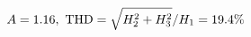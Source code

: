 \documentclass[preview]{standalone}
\begin{document}
\begin{align*}
\special{dvisvgm:raw <g id='unique000'>}A=1.16,\ \text{THD}=\sqrt{H_2^2+H_3^2}/H_1=19.4\%\special{dvisvgm:raw </g>}
\end{align*}
\end{document}
